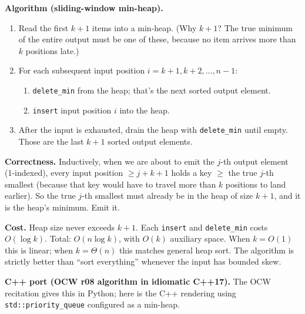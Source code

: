 \documentclass[11pt]{article}
\begin{document}
\textbf{Algorithm (sliding-window min-heap).}

\begin{enumerate}[leftmargin=*]
    \item Read the first $k+1$ items into a min-heap. (Why $k+1$? The
          true minimum of the entire output must be one of these,
          because no item arrives more than $k$ positions late.)
    \item For each subsequent input position $i = k+1, k+2, \ldots,
          n-1$:
          \begin{enumerate}[leftmargin=*]
              \item \texttt{delete\_min} from the heap; that's the
                    next sorted output element.
              \item \texttt{insert} input position $i$ into the heap.
          \end{enumerate}
    \item After the input is exhausted, drain the heap with
          \texttt{delete\_min} until empty. Those are the last $k+1$
          sorted output elements.
\end{enumerate}

\textbf{Correctness.} Inductively, when we are about to emit the
$j$-th output element (1-indexed), every input position
$\ge j + k + 1$ holds a key $\ge$ the true $j$-th smallest (because
that key would have to travel more than $k$ positions to land
earlier). So the true $j$-th smallest must already be in the heap
of size $k+1$, and it is the heap's minimum. Emit it.

\textbf{Cost.} Heap size never exceeds $k+1$. Each
\texttt{insert} and \texttt{delete\_min} costs $O(\log k)$. Total:
$O(n \log k)$, with $O(k)$ auxiliary space. When $k = O(1)$ this is
linear; when $k = \Theta(n)$ this matches general heap sort. The
algorithm is strictly better than ``sort everything'' whenever the
input has bounded skew.

\textbf{C++ port (OCW r08 algorithm in idiomatic C++17).} The OCW
recitation gives this in Python; here is the C++ rendering using
\texttt{std::priority\_queue} configured as a min-heap.
\end{document}
